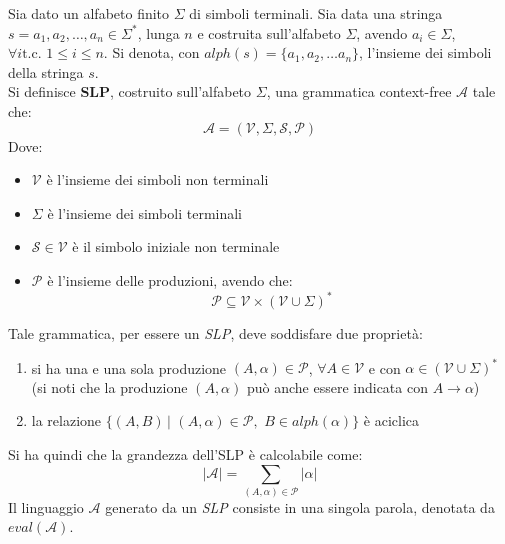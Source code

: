 \begin{definizione}
  Sia dato un alfabeto finito $\Sigma$ di simboli terminali. Sia data una
  stringa $s=a_1,a_2,\ldots, a_n\in\Sigma^{*}$, lunga $n$ e costruita
  sull'alfabeto $\Sigma$, avendo $a_i\in\Sigma$, $\forall i \mbox{
    t.c. }1\leq i\leq n$. Si denota, con $alph(s)=\{a_1,a_2,\ldots
  a_n\}$, l'insieme dei simboli della stringa $s$.\\
  Si definisce \textbf{SLP}, costruito sull'alfabeto $\Sigma$, una grammatica
  context-free $\mathcal{A}$ tale che: 
  \begin{equation}
    \label{eq:slpdef}
    \mathcal{A}=\left(\mathcal{V}, \Sigma, \mathcal{S}, \mathcal{P}\right)
  \end{equation}
  Dove:
  \begin{itemize}
    \item $\mathcal{V}$ è l'insieme dei simboli non terminali
    \item $\Sigma$ è l'insieme dei simboli terminali
    \item $\mathcal{S}\in \mathcal{V}$ è il simbolo iniziale non terminale
    \item $\mathcal{P}$ è l'insieme delle produzioni, avendo che:
    \begin{equation}
      \label{eq:slpprod}
      \mathcal{P}\subseteq \mathcal{V}\times\left(\mathcal{V}\cup
        \Sigma\right)^{*}
    \end{equation}
  \end{itemize}
  Tale grammatica, per essere un \textit{SLP}, deve soddisfare due proprietà:
  \begin{enumerate}
    \item si ha una e una sola produzione $(A,\alpha)\in \mathcal{P}$, $\forall
    A\in \mathcal{V}$ e con $\alpha\in \left(\mathcal{V}\cup\Sigma\right)^{*}$ (si
    noti che la produzione $(A,\alpha)$ può anche essere indicata con
    $A\to\alpha$) 
    \item la relazione $\{(A,B)\,|\,\,(A,\alpha)\in\mathcal{P},\,\,B\in
    alph(\alpha)\}$ è aciclica
  \end{enumerate}
  Si ha quindi che la grandezza dell'SLP è calcolabile come:
  \begin{equation}
    \label{eq:slplen}
    |\mathcal{A}| = \sum_{(A,\alpha)\in\mathcal{P}}|\alpha|
  \end{equation}
  Il linguaggio $\mathcal{A}$ generato da un \textit{SLP}
  consiste in una singola parola, denotata da $eval(\mathcal{A})$.
\end{definizione}
